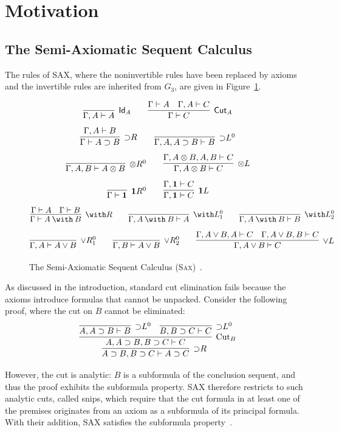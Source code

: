 \section{Motivation}
\label{section:motivation}

\subsection{The Semi-Axiomatic Sequent Calculus}

The rules of SAX, where the noninvertible rules have been replaced by axioms and
the invertible rules are inherited from $G_3$, are given in
Figure~\ref{fig:sax-rules}.

\begin{figure}[ht!]
\[
  \infer[\mathsf{Id}_A]{\Gamma, A \vdash A}{}
  \qquad
  \infer[\mathsf{Cut}_A]{\Gamma \vdash C}{\Gamma \vdash A & \Gamma, A \vdash C}
\]
\[
  \infer[{\supset}R]{\Gamma \vdash A \supset B}{\Gamma, A \vdash B}
  \qquad
  \infer[{\supset}L^0]{\Gamma, A, A \supset B \vdash B}{}
\]
\[
  \infer[{\otimes}R^0]{\Gamma, A, B \vdash A \otimes B}{}
  \qquad
  \infer[{\otimes}L]{\Gamma, A \otimes B \vdash C}{\Gamma, A \otimes B, A, B \vdash C}
\]
\[
  \infer[\mathbf{1}R^0]{\Gamma \vdash \mathbf{1}}{}
  \qquad
  \infer[\mathbf{1}L]{\Gamma, \mathbf{1} \vdash C}{\Gamma, \mathbf{1} \vdash C}
\]
\[
  \infer[{\with}R]{\Gamma \vdash A \mathbin{\with} B}{\Gamma \vdash A & \Gamma \vdash B}
  \qquad
  \infer[{\with}L^0_1]{\Gamma, A \mathbin{\with} B \vdash A}{}
  \qquad
  \infer[{\with}L^0_2]{\Gamma, A \mathbin{\with} B \vdash B}{}
\]
\[
  \infer[{\lor}R^0_1]{\Gamma, A \vdash A \lor B}{}
  \qquad
  \infer[{\lor}R^0_2]{\Gamma, B \vdash A \lor B}{}
  \qquad
  \infer[{\lor}L]{\Gamma, A \lor B \vdash C}{\Gamma, A \lor B, A \vdash C & \Gamma, A \lor B, B \vdash C}
\]
\caption{The Semi-Axiomatic Sequent Calculus (\textsc{Sax})~\cite{DeYoung2020}.}
\label{fig:sax-rules}
\end{figure}

As discussed in the introduction, standard cut elimination fails because the
axioms introduce formulas that cannot be unpacked. Consider the following proof,
where the cut on $B$ cannot be eliminated:
\[
  \infer[{\supset}R]{A \supset B, B \supset C \vdash A \supset C}{
    \infer[\text{Cut}_B]{A, A \supset B, B \supset C \vdash C}{
      \infer[{\supset}L^0]{A, A \supset B \vdash B}{} &
      \infer[{\supset}L^0]{B, B \supset C \vdash C}{}
    }
  }
\]

However, the cut is analytic: $B$ is a subformula of the conclusion sequent, and
thus the proof exhibits the subformula property. SAX therefore restricts to such
analytic cuts, called snips, which require that the cut formula in at least one
of the premises originates from an axiom as a subformula of its principal
formula. With their addition, SAX satisfies the subformula
property~\cite{DeYoung2020}.

